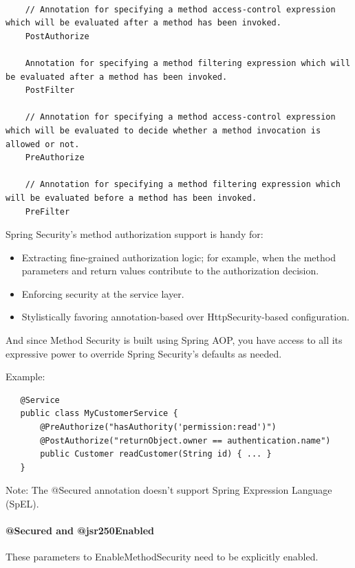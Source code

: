 \documentclass{scrartcl}
\begin{document}
\begin{lstlisting}

    // Annotation for specifying a method access-control expression which will be evaluated after a method has been invoked.
    PostAuthorize

    Annotation for specifying a method filtering expression which will be evaluated after a method has been invoked.
    PostFilter

    // Annotation for specifying a method access-control expression which will be evaluated to decide whether a method invocation is allowed or not.
    PreAuthorize

    // Annotation for specifying a method filtering expression which will be evaluated before a method has been invoked.
    PreFilter

\end{lstlisting}

Spring Security’s method authorization support is handy for:

\begin{itemize}
    \item Extracting fine-grained authorization logic; for example, when the method parameters and return values contribute to the authorization decision.
    \item Enforcing security at the service layer.
    \item Stylistically favoring annotation-based over HttpSecurity-based configuration.
\end{itemize}

And since Method Security is built using Spring AOP, you have access to all its expressive power to override Spring Security’s defaults as needed.

Example:

\begin{lstlisting}
   @Service
   public class MyCustomerService {
       @PreAuthorize("hasAuthority('permission:read')")
       @PostAuthorize("returnObject.owner == authentication.name")
       public Customer readCustomer(String id) { ... }
   }
\end{lstlisting}

Note: The @Secured annotation doesn’t support Spring Expression Language (SpEL).

\paragraph{@Secured and @jsr250Enabled}

These parameters to EnableMethodSecurity need to be explicitly enabled.
\end{document}
